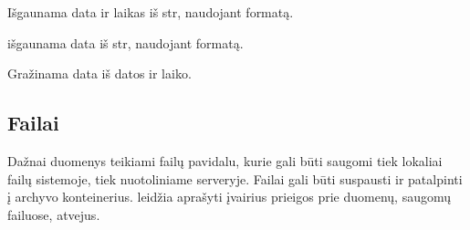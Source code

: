 \documentclass[letterpaper,10pt,lithuanian]{sphinxmanual}
\begin{document}

\begin{fulllineitems}
\label{\detokenize{formules:func.datetime}}
\pysigstartsignatures
{}
\pysigstopsignatures
\sphinxAtStartPar
Išgaunama data ir laikas iš str, naudojant  formatą.

\end{fulllineitems}


\begin{fulllineitems}
\label{\detokenize{formules:func.date}}
\pysigstartsignatures
{}
\pysigstopsignatures
\sphinxAtStartPar
išgaunama data iš str, naudojant  formatą.

\end{fulllineitems}


\begin{fulllineitems}
\label{\detokenize{formules:id0}}
\pysigstartsignatures
{}
\pysigstopsignatures
\sphinxAtStartPar
Gražinama data iš datos ir laiko.

\end{fulllineitems}



\subsection{Failai}
\label{\detokenize{formules:failai}}\label{\detokenize{formules:id3}}
\sphinxAtStartPar
Dažnai duomenys teikiami failų pavidalu, kurie gali būti saugomi tiek lokaliai
failų sistemoje, tiek nuotoliniame serveryje. Failai gali būti suspausti ir
patalpinti į archyvo konteinerius. {\hyperref[\detokenize{savokos:term-DSA}]{}} leidžia aprašyti įvairius
prieigos prie duomenų, saugomų failuose, atvejus.
\end{document}
